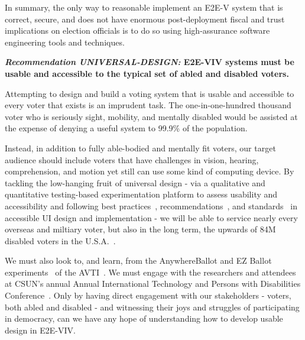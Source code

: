 In summary, the only way to reasonable implement an E2E-V system that
is correct, secure, and does not have enormous post-deployment fiscal
and trust implications on election officials is to do so using
high-assurance software engineering tools and techniques.
\begin{center}
  \textbf{\emph{Recommendation UNIVERSAL-DESIGN:} E2E-VIV systems must
    be usable and accessible to the typical set of abled and disabled
    voters.}
\end{center}

Attempting to design and build a voting system that is usable and
accessible to every voter that exists is an imprudent task. The
one-in-one-hundred thousand voter who is seriously sight, mobility,
and mentally disabled would be assisted at the expense of denying a
useful system to 99.9\% of the population.

Instead, in addition to fully able-bodied and mentally fit voters, our
target audience should include voters that have challenges in vision,
hearing, comprehension, and motion yet still can use some kind of
computing device. By tackling the low-hanging fruit of universal
design - via a qualitative and quantitative testing-based
experimentation platform to assess usability and accessibility and
following best practices~\cite{materials-at-elections.itif.org},
recommendations~\cite{WAI,Section508,WAVE}, and
standards~\cite{standards} in accessible UI design and implementation
- we will be able to service nearly every overseas and miltiary voter,
but also in the long term, the upwards of 84M disabled voters in the
U.S.A.~\cite{Brennen,CensusData}.

We must also look to, and learn, from the AnywhereBallot and
EZ Ballot experiments~\cite{AnywhereBallot,EZBallot} of the
AVTI~\cite{AVTI}.  We must engage with the researchers and attendees
at CSUN's annual Annual International Technology and Persons with
Disabilities Conference~\cite{CSUN}. Only by having direct engagement
with our stakeholders - voters, both abled and disabled - and
witnessing their joys and struggles of participating in democracy, can
we have any hope of understanding how to develop usable design in
E2E-VIV.


